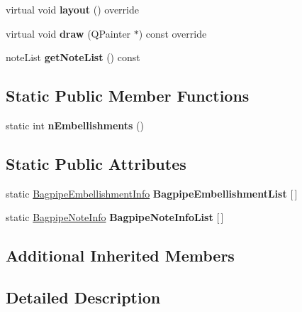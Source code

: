 \begin{DoxyCompactItemize}
\mbox{\label{class_ms_1_1_bagpipe_embellishment_aa5f5832d42d5367bf31cb41a916f3ab0}} 
virtual void {\bfseries layout} () override
\item 
\mbox{\label{class_ms_1_1_bagpipe_embellishment_ac849afcb7f7fcdd7bde1178607c6818a}} 
virtual void {\bfseries draw} (Q\+Painter $\ast$) const override
\item 
\mbox{\label{class_ms_1_1_bagpipe_embellishment_a28eb0d51e18f60e0e6071c5ced15ef10}} 
note\+List {\bfseries get\+Note\+List} () const
\end{DoxyCompactItemize}
\subsection*{Static Public Member Functions}
\begin{DoxyCompactItemize}
\item 
\mbox{\label{class_ms_1_1_bagpipe_embellishment_a5f1ebce90d91239e80bc0f868bd5e868}} 
static int {\bfseries n\+Embellishments} ()
\end{DoxyCompactItemize}
\subsection*{Static Public Attributes}
\begin{DoxyCompactItemize}
\item 
\mbox{\label{class_ms_1_1_bagpipe_embellishment_a7e044e828fdb5c53c710c0fe13730c84}} 
static \hyperlink{struct_ms_1_1_bagpipe_embellishment_info}{Bagpipe\+Embellishment\+Info} {\bfseries Bagpipe\+Embellishment\+List} \mbox{[}$\,$\mbox{]}
\item 
static \hyperlink{struct_ms_1_1_bagpipe_note_info}{Bagpipe\+Note\+Info} {\bfseries Bagpipe\+Note\+Info\+List} \mbox{[}$\,$\mbox{]}
\end{DoxyCompactItemize}
\subsection*{Additional Inherited Members}


\subsection{Detailed Description}


